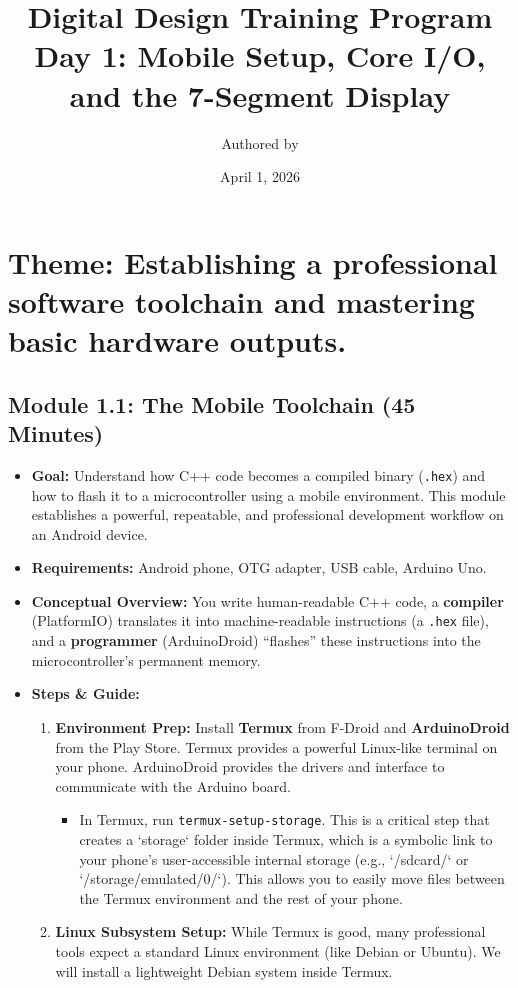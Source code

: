 \documentclass[11pt,a4paper]{article}
\title{Digital Design Training Program \\ \large Day 1: Mobile Setup, Core I/O, and the 7-Segment Display}
\author{Authored by }
\date{April 1, 2026}
\begin{document}
\maketitle

\section*{Theme: Establishing a professional software toolchain and mastering basic hardware outputs.}

\subsection*{Module 1.1: The Mobile Toolchain (45 Minutes)}

\begin{itemize}
    \item \textbf{Goal:} Understand how C++ code becomes a compiled binary (\verb|.hex|) and how to flash it to a microcontroller using a mobile environment. This module establishes a powerful, repeatable, and professional development workflow on an Android device.
    \item \textbf{Requirements:} Android phone, OTG adapter, USB cable, Arduino Uno.
    \item \textbf{Conceptual Overview:} You write human-readable C++ code, a \textbf{compiler} (PlatformIO) translates it into machine-readable instructions (a \verb|.hex| file), and a \textbf{programmer} (ArduinoDroid) ``flashes'' these instructions into the microcontroller's permanent memory.
    \item \textbf{Steps \& Guide:}
    \begin{enumerate}[label=\arabic*.]
        \item \textbf{Environment Prep:} Install \textbf{Termux} from F-Droid and \textbf{ArduinoDroid} from the Play Store. Termux provides a powerful Linux-like terminal on your phone. ArduinoDroid provides the drivers and interface to communicate with the Arduino board.
        \begin{itemize}
            \item In Termux, run \verb|termux-setup-storage|. This is a critical step that creates a `storage` folder inside Termux, which is a symbolic link to your phone's user-accessible internal storage (e.g., `/sdcard/` or `/storage/emulated/0/`). This allows you to easily move files between the Termux environment and the rest of your phone.
        \end{itemize}
        \item \textbf{Linux Subsystem Setup:} While Termux is good, many professional tools expect a standard Linux environment (like Debian or Ubuntu). We will install a lightweight Debian system inside Termux.

\end{enumerate}
\end{itemize}
\end{document}
